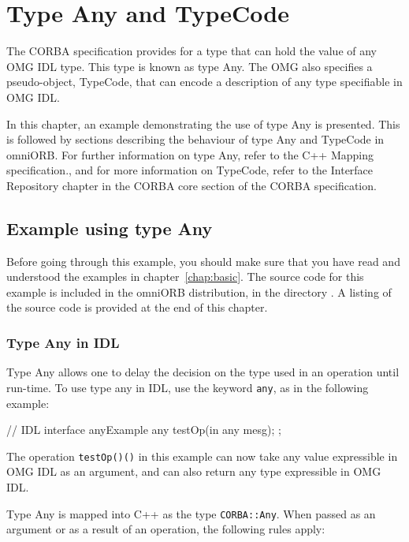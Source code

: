 \documentclass[11pt,twoside,a4paper]{book}
\newcommand{\type}[1]{\texttt{#1}}
\newcommand{\code}[1]{\texttt{#1}}
\newcommand{\op}[1]{\texttt{#1()}}
\newcommand{\file}{\begingroup \urlstyle{tt}\Url}
\begin{document}
\chapter{Type Any and TypeCode}
\label{chap:any}

The CORBA specification provides for a type that can hold the value of
any OMG IDL type. This type is known as type Any. The OMG also
specifies a pseudo-object, TypeCode, that can encode a description of
any type specifiable in OMG IDL.

In this chapter, an example demonstrating the use of type Any is
presented.  This is followed by sections describing the behaviour of
type Any and TypeCode in omniORB.  For further information on type
Any, refer to the C++ Mapping specification., and for more information
on TypeCode, refer to the Interface Repository chapter in the CORBA
core section of the CORBA specification.



\section{Example using type Any}

Before going through this example, you should make sure that you have
read and understood the examples in chapter~\ref{chap:basic}.  The
source code for this example is included in the omniORB distribution,
in the directory \file{src/examples/anyExample}. A listing of the
source code is provided at the end of this chapter.

\subsection{Type Any in IDL}
Type Any allows one to delay the decision on the type used in an
operation until run-time. To use type any in IDL, use the keyword
\code{any}, as in the following example:

\begin{idllisting}
// IDL
interface anyExample {
  any testOp(in any mesg);
};
\end{idllisting}


\noindent The operation \op{testOp()} in this example can now take any
value expressible in OMG IDL as an argument, and can also return any
type expressible in OMG IDL.

Type Any is mapped into C++ as the type \type{CORBA::Any}. When passed
as an argument or as a result of an operation, the following rules
apply:
\end{document}
